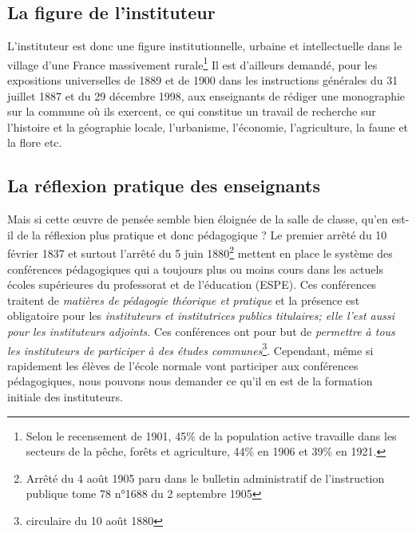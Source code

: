 \documentclass[a4paper,11pt]{article}
\begin{document}
			\subsection{La figure de l'instituteur}
				L'instituteur est donc une figure institutionnelle, urbaine et intellectuelle dans le village d'une France massivement rurale\footnote{Selon le recensement de 1901, 45\% de la population active travaille dans les secteurs de la pêche, forêts et agriculture, 44\% en 1906 et 39\% en 1921.} Il est d'ailleurs demandé, pour les expositions universelles de 1889 et de 1900 dans les instructions générales du 31 juillet 1887 et du 29 décembre 1998, aux enseignants de rédiger une monographie sur la commune où ils exercent, ce qui constitue un travail de recherche sur l'histoire et la géographie locale, l'urbanisme, l'économie, l'agriculture, la faune et la flore etc.   
			\subsection{La réflexion pratique des enseignants}
			Mais si cette œuvre de pensée semble bien éloignée de la salle de classe, qu'en est-il de la réflexion plus pratique et donc pédagogique ? Le premier arrêté du 10 février 1837 et surtout l'arrêté du 5 juin 1880\footnote{Arrêté du 4 août 1905 paru dans le bulletin administratif de l'instruction publique tome 78 n°1688 du 2 septembre 1905} mettent en place le système des conférences pédagogiques qui a toujours plus ou moins cours dans les actuels écoles supérieures du professorat et de l'éducation (ESPE). Ces conférences traitent de \emph{matières de pédagogie théorique et pratique} et la présence est obligatoire pour les \emph{instituteurs et institutrices publics titulaires; elle l'est aussi pour les instituteurs adjoints}. Ces conférences ont pour but de \emph{permettre à tous les instituteurs de participer à des études communes}\footnote{circulaire du 10 août 1880}.
			Cependant, même si rapidement les élèves de l'école normale vont participer aux conférences pédagogiques, nous pouvons nous demander ce qu'il en est de la formation initiale des instituteurs. 
\end{document}
